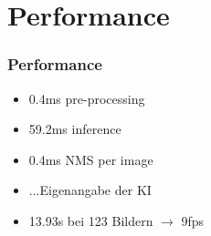 \documentclass[ignorenonframetext,naustrian,12pt,t]{beamer}
\begin{document}
\section{Performance}
\begin{frame}
	\frametitle{Performance}
		\begin{itemize}[label={\color{myTitleColour}\textbullet}]
		\item 0.4ms pre-processing
		\item 59.2ms inference
		\item 0.4ms NMS per image
		\item ...Eigenangabe der KI
		\item 13.93s bei 123 Bildern $\rightarrow$ 9fps
		\end{itemize}
\end{frame}






\end{document}
